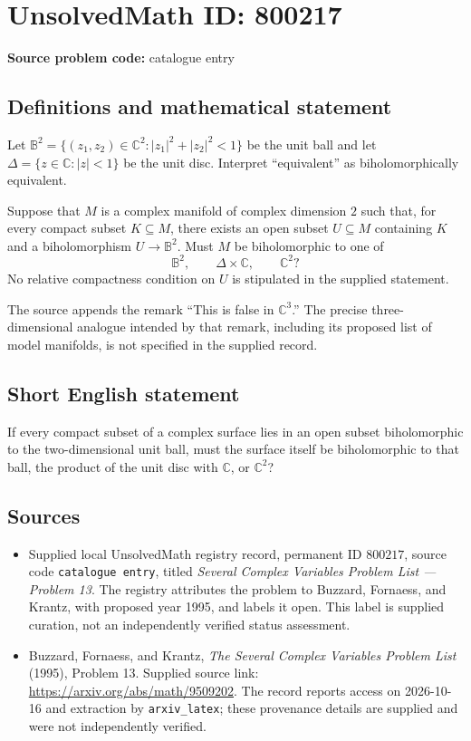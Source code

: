 \documentclass[11pt]{article}
\newcommand{\C}{\mathbb{C}}
\begin{document}
\section*{UnsolvedMath ID: 800217}
\textbf{Source problem code:} catalogue entry
\subsection{Definitions and mathematical statement}
Let \(\mathbb{B}^{2}=\{(z_1,z_2)\in\C^2:|z_1|^2+|z_2|^2<1\}\) be the unit ball and let \(\Delta=\{z\in\C:|z|<1\}\) be the unit disc. Interpret ``equivalent'' as biholomorphically equivalent.

Suppose that \(M\) is a complex manifold of complex dimension \(2\) such that, for every compact subset \(K\subseteq M\), there exists an open subset \(U\subseteq M\) containing \(K\) and a biholomorphism \(U\to\mathbb{B}^{2}\). Must \(M\) be biholomorphic to one of
\[
\mathbb{B}^{2},\qquad \Delta\times\C,\qquad \C^{2}?
\]
No relative compactness condition on \(U\) is stipulated in the supplied statement.

The source appends the remark ``This is false in \(\C^3\).'' The precise three-dimensional analogue intended by that remark, including its proposed list of model manifolds, is not specified in the supplied record.
\subsection{Short English statement}
If every compact subset of a complex surface lies in an open subset biholomorphic to the two-dimensional unit ball, must the surface itself be biholomorphic to that ball, the product of the unit disc with \(\C\), or \(\C^2\)?
\subsection{Sources}
\begin{itemize}
\item Supplied local UnsolvedMath registry record, permanent ID \(800217\), source code \texttt{catalogue entry}, titled \emph{Several Complex Variables Problem List --- Problem 13}. The registry attributes the problem to Buzzard, Fornaess, and Krantz, with proposed year 1995, and labels it open. This label is supplied curation, not an independently verified status assessment.
\item Buzzard, Fornaess, and Krantz, \emph{The Several Complex Variables Problem List} (1995), Problem 13. Supplied source link: \url{https://arxiv.org/abs/math/9509202}. The record reports access on 2026-10-16 and extraction by \texttt{arxiv\_latex}; these provenance details are supplied and were not independently verified.
\end{itemize}
\end{document}

